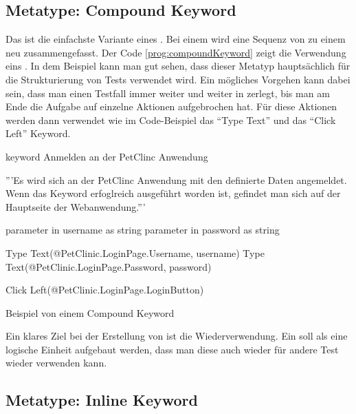 \subsection{Metatype: Compound Keyword}

Das  ist die einfachste Variante eines . Bei einem  wird eine Sequenz von  zu einem neu  zusammengefasst. Der Code \ref{prog:compoundKeyword} zeigt die Verwendung eins . In dem Beispiel kann man gut sehen, dass dieser Metatyp hauptsächlich für die Strukturierung von Tests verwendet wird. Ein mögliches Vorgehen kann dabei sein, dass man einen Testfall immer weiter und weiter in  zerlegt, bis man am Ende die Aufgabe auf einzelne Aktionen aufgebrochen hat. Für diese Aktionen werden dann  verwendet wie im Code-Beispiel das "`Type Text"' und das "`Click Left"' Keyword.

\begin{program}
\begin{JavaCode}
keyword Anmelden an der PetClinc Anwendung{
	'''Es wird sich an der PetClinc Anwendung mit den definierte Daten 
	   angemeldet. Wenn das Keyword erfoglreich ausgeführt worden ist, 
	   gefindet man sich auf der Hauptseite der Webanwendung.'''
	
	parameter in username as string
	parameter in password as string
	
	Type Text(@PetClinic.LoginPage.Username, username)
	Type Text(@PetClinic.LoginPage.Password, password)
	
	Click Left(@PetClinic.LoginPage.LoginButton)
}
\end{JavaCode}
\caption{Beispiel von einem Compound Keyword}
\label{prog:compoundKeyword}
\end{program}

\SuperPar
Ein klares Ziel bei der Erstellung von  ist die Wiederverwendung. Ein  soll als eine logische Einheit aufgebaut werden, dass man diese auch wieder für andere Test wieder verwenden kann. 


\subsection{Metatype: Inline Keyword}

